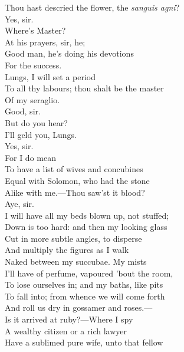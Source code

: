 \documentclass[a4paper,oneside,12pt]{memoir}
\begin{document}
\begin{drama*}
Thou hast descried the flower, the \emph{sanguis agni}?\\
\facespeaks Yes, sir.\\
\mammonspeaks {} Where's Master?\\
\facespeaks {} At his prayers, sir, he;\\
Good man, he's doing his devotions\\
For the success.\\
\mammonspeaks {} Lungs, I will set a period\\
To all thy labours; thou shalt be the master\\
Of my seraglio.\\
\facespeaks {} Good, sir.\\
\mammonspeaks {} But do you hear?\\
I'll geld you, Lungs.\\
\facespeaks {} Yes, sir.\\
\mammonspeaks {} For I do mean\\
To have a list of wives and concubines\\
Equal with Solomon, who had the stone\\
Alike with me.---Thou saw'st it blood?\\
\facespeaks {} Aye, sir.\\
\mammonspeaks I will have all my beds blown up, not stuffed;\\
Down is too hard: and then my looking glass\\
Cut in more subtle angles, to disperse\\
And multiply the figures as I walk\\
Naked between my succubae. My mists\\
I'll have of perfume, vapoured 'bout the room,\\
To lose ourselves in; and my baths, like pits\\
To fall into; from whence we will come forth\\
And roll us dry in gossamer and roses.---\\
Is it arrived at ruby?---Where I spy\\
A wealthy citizen or a rich lawyer\\
Have a sublimed pure wife, unto that fellow\\

\end{drama*}
\end{document}

